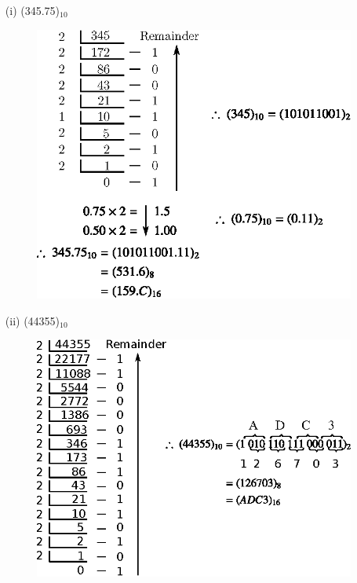 \begin{solution}
\begin{itemize}
\item[(i)] (345.75)$_{10}$
\begin{figure}[H]
\centering
\includegraphics{chap5/div19.eps}
\end{figure}

\item[(ii)] (44355)$_{10}$
\begin{figure}[H]
\centering
\includegraphics{chap5/div20.eps}
\end{figure}


\end{itemize}
\end{solution}
